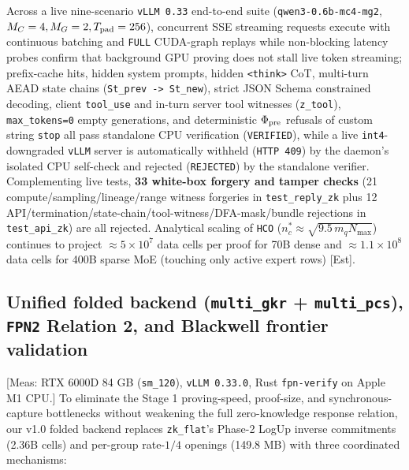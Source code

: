 \documentclass[10pt]{article}
\begin{document}
Across a live nine-scenario \texttt{vLLM 0.\allowbreak{}33} end-to-end suite (\texttt{qwen3-0.\allowbreak{}6b-mc4-mg2}, $M_C=4, M_G=2, T_{\rm pad}=256$), concurrent SSE streaming requests execute with continuous batching and \texttt{FULL} CUDA-graph replays while non-blocking latency probes confirm that background GPU proving does not stall live token streaming; prefix-cache hits, hidden system prompts, hidden \texttt{<think>} CoT, multi-turn AEAD state chains (\texttt{St\_\allowbreak{}prev -> St\_\allowbreak{}new}), strict JSON Schema constrained decoding, client \texttt{tool\_\allowbreak{}use} and in-turn server tool witnesses (\texttt{z\_\allowbreak{}tool}), \texttt{max\_\allowbreak{}tokens=0} empty generations, and deterministic $\Phi_{\rm pre}$ refusals of custom string \texttt{stop} all pass standalone CPU verification (\texttt{VERIFIED}), while a live \texttt{int4}-downgraded \texttt{vLLM} server is automatically withheld (\texttt{HTTP 409}) by the daemon's isolated CPU self-check and rejected (\texttt{REJECTED}) by the standalone verifier. Complementing live tests, \textbf{33 white-box forgery and tamper checks} (21 compute/sampling/lineage/range witness forgeries in \texttt{test\_\allowbreak{}reply\_\allowbreak{}zk} plus 12 API/termination/state-chain/tool-witness/DFA-mask/bundle rejections in \texttt{test\_\allowbreak{}api\_\allowbreak{}zk}) are all rejected. Analytical scaling of \texttt{HCO} ($n_c^*\approx\sqrt{9.5\,m_q N_{\max}}$) continues to project $\approx 5\times 10^7$ data cells per proof for 70B dense and $\approx 1.1\times 10^8$ data cells for 400B sparse MoE (touching only active expert rows) [Est].

\subsection{Unified folded backend (\texttt{multi\_\allowbreak{}gkr} + \texttt{multi\_\allowbreak{}pcs}), \texttt{FPN2} Relation 2, and Blackwell frontier validation}
[Meas: RTX 6000D 84 GB (\texttt{sm\_\allowbreak{}120}), \texttt{vLLM 0.\allowbreak{}33.\allowbreak{}0}, Rust \texttt{fpn-verify} on Apple M1 CPU.] To eliminate the Stage 1 proving-speed, proof-size, and synchronous-capture bottlenecks without weakening the full zero-knowledge response relation, our v1.0 folded backend replaces \texttt{zk\_\allowbreak{}flat}'s Phase-2 LogUp inverse commitments (2.36B cells) and per-group rate-$1/4$ openings (149.8 MB) with three coordinated mechanisms:
\end{document}
